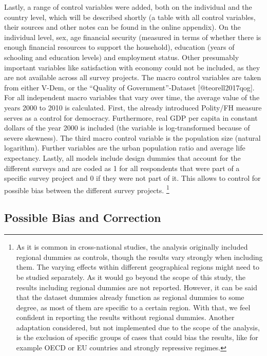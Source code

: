 \documentclass[]{article}
\let\rmarkdownfootnote\footnote%
\def\footnote{\protect\rmarkdownfootnote}
\begin{document}
Lastly, a range of control variables were added, both on the individual
and the country level, which will be described shortly (a table with all
control variables, their sources and other notes can be found in the
online appendix). On the individual level, sex, age financial security
(measured in terms of whether there is enough financial resources to
support the household), education (years of schooling and education
levels) and employment status. Other presumably important variables like
satisfaction with economy could not be included, as they are not
available across all survey projects. The macro control variables are
taken from either V-Dem, or the ``Quality of Government''-Dataset
{[}@teorell2017qog{]}. For all independent macro variables that vary
over time, the average value of the years 2000 to 2010 is calculated.
First, the already introduced Polity/FH measure serves as a control for
democracy. Furthermore, real GDP per capita in constant dollars of the
year 2000 is included (the variable is log-transformed because of severe
skewness). The third macro control variable is the population size
(natural logarithm). Further variables are the urban population ratio
and average life expectancy. Lastly, all models include design dummies
that account for the different surveys and are coded as 1 for all
respondents that were part of a specific survey project and 0 if they
were not part of it. This allows to control for possible bias between
the different survey projects.
\footnote{As it is common in cross-national studies, the analysis originally included regional dummies as controls, though the results vary strongly when including them. The varying effects within different geographical regions might need to be studied separately. As it would go beyond the scope of this study, the results including regional dummies are not reported. However, it can be said that the dataset dummies already function as regional dummies to some degree, as most of them are specific to a certain region. With that, we feel confident in reporting the results without regional dummies. Another adaptation considered, but not implemented due to the scope of the analysis, is the exclusion of specific groups of cases that could bias the results, like for example OECD or EU countries and strongly repressive regimes.}

\subsection{Possible Bias and Correction} \label{bias_section}
\end{document}
